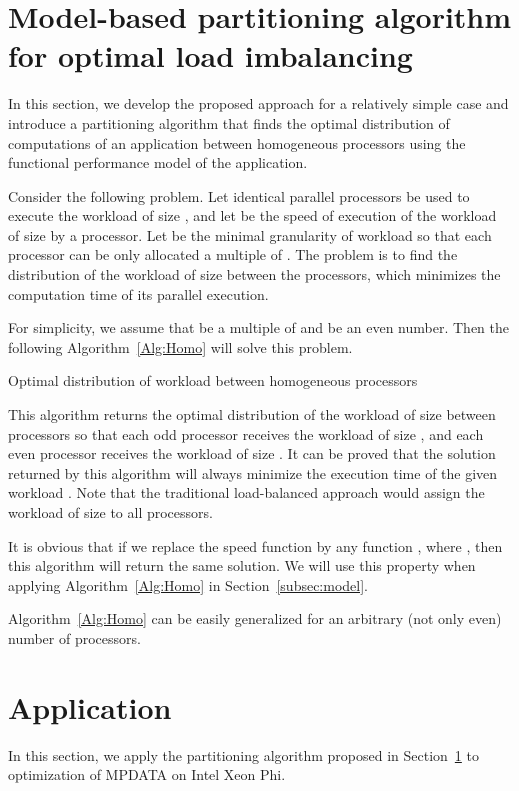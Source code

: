 \documentclass{acm_proc_article-sp}
\begin{document}
\section{Model-based partitioning algorithm for optimal load imbalancing}
\label{sec:model}
In this section, we develop the proposed approach for a relatively simple case and introduce a partitioning algorithm that finds the optimal distribution of computations of an application between homogeneous processors using the functional performance model of the application.

Consider the following problem. Let  identical parallel processors be used to execute the workload of size , and let  be the speed of execution of the workload of size  by a processor. Let  be the minimal granularity of workload so that each processor can be only allocated a multiple of . The problem is to find the distribution of the workload of size  between the  processors, which minimizes the computation time of its parallel execution.

For simplicity, we assume that  be a multiple of  and  be an even number. Then the following Algorithm~\ref{Alg:Homo} will solve this problem.

\begin{algorithm}
\caption{Optimal distribution of workload between homogeneous processors}
\begin{algorithmic}
\STATE 
\STATE 
\REPEAT
\STATE 
\STATE 
\STATE 
\IF{}
\STATE 
\STATE 
\STATE 
\ENDIF
\UNTIL{}
\end{algorithmic}
\label{Alg:Homo}
\end{algorithm}

This algorithm returns the optimal distribution of the workload of size   between  processors so that each odd processor receives the workload of size , and each even processor receives the workload of size . It can be proved that the solution returned by this algorithm will always minimize the execution time of the given workload . Note that the traditional load-balanced approach would assign the workload of size  to all processors.

It is obvious that if we replace the speed function  by any function , where , then this algorithm  will return the same solution. We will use this property when applying Algorithm~\ref{Alg:Homo} in Section~\ref{subsec:model}.

Algorithm~\ref{Alg:Homo} can be easily generalized for an arbitrary (not only even) number of processors.

\section{Application}
\label{sec:app}
In this section, we apply the partitioning algorithm proposed in Section~\ref{sec:model} to optimization of MPDATA on Intel Xeon Phi.
\end{document}
